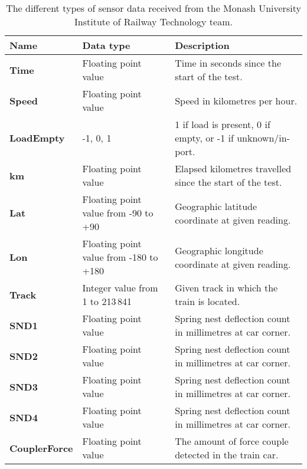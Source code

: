 \begin{table}[ht]
\caption{The different types of sensor data received from the Monash University Institute of Railway Technology team.}
\label{tab:irt_data}
\begin{adjustbox}{max width=\textwidth}
\tabcolsep=0.11cm
\begin{tabular}{ |>{\columncolor[gray]{0.9}}l | l | l | }

\hline
\rowcolor{gray!20}
\textbf{Name}           & \textbf{Data type}                     & \textbf{Description} \\ \hline
\textbf{Time}           & Floating point value                   & Time in seconds since the start of the test. \\ \hline
\textbf{Speed}          & Floating point value                   & Speed in kilometres per hour. \\ \hline
\textbf{LoadEmpty}      & -1, 0, 1                               & 1 if load is present, 0 if empty, or -1 if unknown/in-port.  \\ \hline
\textbf{km}             & Floating point value                   & Elapsed kilometres travelled since the start of the test.\\ \hline
\textbf{Lat}            & Floating point value from -90 to +90   & Geographic latitude coordinate at given reading.  \\ \hline
\textbf{Lon}            & Floating point value from -180 to +180 & Geographic longitude coordinate at given reading.  \\ \hline
\textbf{Track}          & Integer value from 1 to 213\,841         & Given track in which the train is located.   \\ \hline
\textbf{SND1}           & Floating point value                   & Spring nest deflection count in millimetres at car corner.  \\ \hline
\textbf{SND2}           & Floating point value                   & Spring nest deflection count in millimetres at car corner.  \\ \hline
\textbf{SND3}           & Floating point value                   & Spring nest deflection count in millimetres at car corner.  \\ \hline
\textbf{SND4}           & Floating point value                   & Spring nest deflection count in millimetres at car corner.  \\ \hline
\textbf{CouplerForce}   & Floating point value                   & The amount of force couple detected in the train car.  \\ \hline

\end{tabular}
\end{adjustbox}
\end{table}
